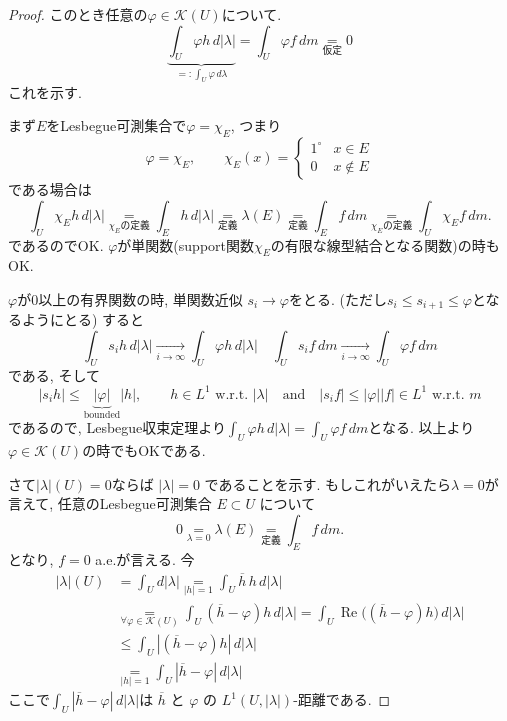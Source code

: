 \begin{proof}
このとき任意の\(\varphi \in \mathcal{K}(U)\)について. 
 \[\displaystyle \underbrace{\int_U \varphi h\,d|\lambda|}_{=:\int_U \varphi\,d\lambda} = \int_U \varphi f\,dm \underset{\text{仮定}}{=} 0\]
これを示す.

まず$E$をLesbegue可測集合で$\varphi=\chi_E$, つまり
$$\varphi=\chi_E,\qquad
\chi_E(x)=
\begin{cases}
1^\circ & x\in E\\
0 & x\notin E
\end{cases}
$$
である場合は
\[
\int_U \chi_E h\,d|\lambda|
\underset{\text{$\chi_E$の定義}}{=}
\int_E h\,d|\lambda|
\underset{\text{定義}}{=}
\lambda(E)
\underset{\text{定義}}{=}
\int_E f\,dm
\underset{\text{$\chi_E$の定義}}{=}
\int_U \chi_E f\,dm.
\]
であるのでOK.
\( \varphi\)が単関数(support関数$\chi_E$の有限な線型結合となる関数)の時もOK.

$ \varphi$が0以上の有界関数の時, 
単関数近似
\(s_i \to \varphi \)をとる. (ただし$s_i \le s_{i+1} \le \varphi $となるようにとる)
すると
\[
\int_U s_i h\,d|\lambda| \xrightarrow[i\to\infty]{} \int_U \varphi h\,d|\lambda|
\quad 
\int_U s_i f\,dm \xrightarrow[i\to\infty]{} \int_U \varphi f\,dm
\]
である, そして
\[
|s_i h|\leq \underbrace{|\varphi|}_{\text{bounded}}|h|,\qquad h\in L^1 \text{ w.r.t. } |\lambda|
\quad \text{and} \quad
|s_i f|\leq |\varphi||f| \in L^1 \text{ w.r.t. } m
\]
であるので, Lesbegue収束定理より$\int_U \varphi h\,d|\lambda|= \int_U \varphi f\,dm$となる. 
以上より$\varphi \in \mathcal{K}(U)$の時でもOKである. 

さて\(|\lambda|(U)=0\)ならば \(|\lambda|=0\) であることを示す. 
もしこれがいえたら\(\lambda=0\)が言えて,  任意のLesbegue可測集合 \( E\subset U\) について
\[
0\underset{\lambda=0}{=}\lambda(E)
\underset{\text{定義}}{=}\int_E f\,dm.
\]
となり, $f=0$ a.e.が言える.
今
\begin{align*}
|\lambda|(U)
&=\int_U d|\lambda|
\underset{|h|=1}{=}
\int_U \overline{h}\,h\,d|\lambda| \\
&\underset{\forall \varphi\in \mathcal{K}(U)}{=}\int_U (\overline{h}-\varphi)h\,d|\lambda|
\underset{}{=}\int_U \operatorname{Re}\bigl((\overline{h}-\varphi)h\bigr)\,d|\lambda| \\
&\underset{}{\le}
\int_U |(\overline{h}-\varphi)h|\,d|\lambda|\\
&\underset{|h|=1}{=}\int_U |\overline{h}-\varphi|\,d|\lambda|
\end{align*}
ここで$\int_U |\overline{h}-\varphi|\,d|\lambda|$は
\(\overline{h}\) と \(\varphi\) の \(L^1(U,|\lambda|)\)-距離である.


\end{proof}

